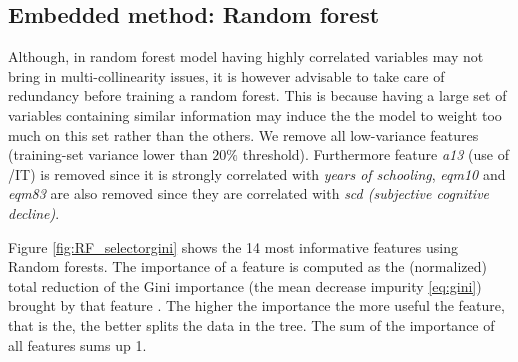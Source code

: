 \documentclass[preprint,12pt]{elsarticle}
\begin{document}
\subsection{Embedded method: Random forest}

Although, in random forest model having highly correlated variables may not bring in multi-collinearity issues, it is however advisable to take care of redundancy before training a random forest. This is because having a large set of variables containing similar information may induce the the model to weight too much on this set rather than the others.
We remove all low-variance features (training-set variance lower than $20\%$ threshold). Furthermore feature \emph{a13} (use of /IT) is removed since it is strongly correlated with \emph{years of schooling}, \emph{eqm10} and \emph{eqm83} are also removed since they are correlated with \emph{scd (subjective cognitive decline)}. 

Figure \ref{fig:RF_selectorgini} shows the 14 most informative features using Random forests. The importance of a feature is computed as the (normalized) total reduction of the Gini importance (the mean decrease impurity \ref{eq:gini}) brought by that feature \cite{breiman2017classification}. The higher the importance 
the more useful the feature, that is the, the better splits the data in the tree. The sum of the importance of all features sums up 1.
\end{document}
